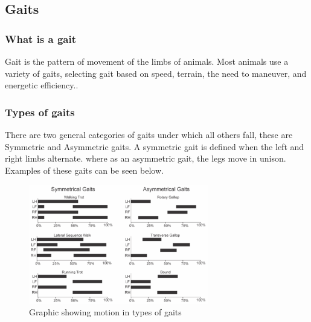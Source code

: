\subsection{Gaits}
    \subsubsection{What is a gait}
   Gait is the pattern of movement of the limbs of animals. Most animals use a variety of gaits, selecting gait based on speed, terrain, the need to maneuver, and energetic efficiency.\cite{wikipedia_2018_Gaits}.  
    
    \subsubsection{Types of gaits}
    There are two general categories of gaits under which all others fall, these are Symmetric and Asymmetric gaits. A symmetric gait is defined when the left and right limbs alternate. where as an asymmetric gait, the legs move in unison. Examples of these gaits can be seen below.  
    \begin{figure}[H]
        \centering
        \includegraphics[width=0.7\textwidth]{figures/Gait_graphs_v2.png}
        \caption{Graphic showing motion in types of gaits}
        \label{fig:my_label}
    \end{figure}
   
    




